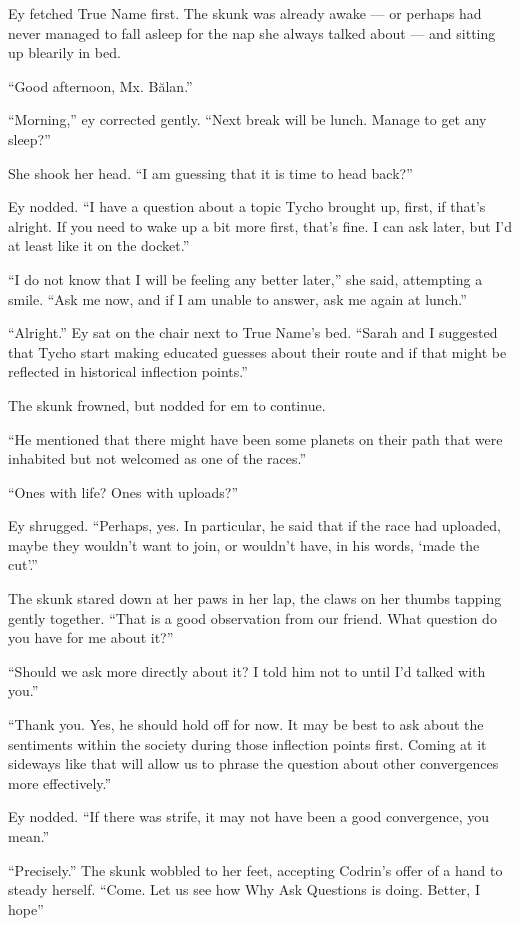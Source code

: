 Ey fetched True Name first. The skunk was already awake — or perhaps had never managed to fall asleep for the nap she always talked about — and sitting up blearily in bed.

``Good afternoon, Mx. Bălan.''

``Morning,'' ey corrected gently. ``Next break will be lunch. Manage to get any sleep?''

She shook her head. ``I am guessing that it is time to head back?''

Ey nodded. ``I have a question about a topic Tycho brought up, first, if that's alright. If you need to wake up a bit more first, that's fine. I can ask later, but I'd at least like it on the docket.''

``I do not know that I will be feeling any better later,'' she said, attempting a smile. ``Ask me now, and if I am unable to answer, ask me again at lunch.''

``Alright.'' Ey sat on the chair next to True Name's bed. ``Sarah and I suggested that Tycho start making educated guesses about their route and if that might be reflected in historical inflection points.''

The skunk frowned, but nodded for em to continue.

``He mentioned that there might have been some planets on their path that were inhabited but not welcomed as one of the races.''

``Ones with life? Ones with uploads?''

Ey shrugged. ``Perhaps, yes. In particular, he said that if the race had uploaded, maybe they wouldn't want to join, or wouldn't have, in his words, `made the cut'.''

The skunk stared down at her paws in her lap, the claws on her thumbs tapping gently together. ``That is a good observation from our friend. What question do you have for me about it?''

``Should we ask more directly about it? I told him not to until I'd talked with you.''

``Thank you. Yes, he should hold off for now. It may be best to ask about the sentiments within the society during those inflection points first. Coming at it sideways like that will allow us to phrase the question about other convergences more effectively.''

Ey nodded. ``If there was strife, it may not have been a good convergence, you mean.''

``Precisely.'' The skunk wobbled to her feet, accepting Codrin's offer of a hand to steady herself. ``Come. Let us see how Why Ask Questions is doing. Better, I hope''

